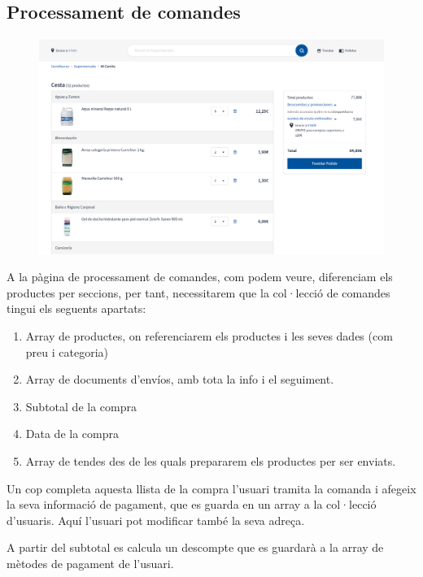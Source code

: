 \newpage

\subsection{Processament de comandes}

\begin{figure}[htpb!]
    \centering
    \includegraphics[width=400pt]{figures/Pedido.png}
\end{figure}

A la pàgina de processament de comandes, com podem veure, diferenciam els productes per seccions, per tant, necessitarem
que la col·lecció de comandes tingui els seguents apartats:

\begin{enumerate}
    \item Array de productes, on referenciarem els productes i les seves dades (com preu i categoria)
    \item Array de documents d'envíos, amb tota la info i el seguiment.
    \item Subtotal de la compra
    \item Data de la compra
    \item Array de tendes des de les quals prepararem els productes per ser enviats.
\end{enumerate}

Un cop completa aquesta llista de la compra l'usuari tramita la comanda i afegeix la seva informació de pagament, 
que es guarda en un array a la col·lecció d'usuaris. Aquí l'usuari pot modificar també la seva adreça.

A partir del subtotal es calcula un descompte que es guardarà a la array de mètodes de pagament de l'usuari.

